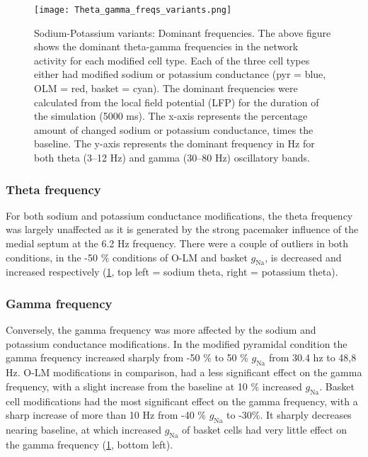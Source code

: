 \begin{figure}[htbp]
    \centering
    \texttt{[image: Theta\_gamma\_freqs\_variants.png]}
    \caption[Sodium-Potassium variants: Dominant frequencies]{Sodium-Potassium variants: Dominant frequencies.
        The above figure shows the dominant theta-gamma frequencies in the network activity for each modified cell type.
        Each of the three cell types either had modified sodium or potassium conductance (pyr = blue, OLM = red, basket = cyan).
        The dominant frequencies were calculated from the local field potential (LFP) for the duration of the simulation (5000 ms).
        The x-axis represents the percentage amount of changed sodium or potassium conductance, times the baseline.
        The y-axis represents the dominant frequency in Hz for both theta (3--12 Hz) and gamma (30--80 Hz) oscillatory bands.}\label{fig:sodium_potassium_frequencies}
\end{figure}

\subsubsection{Theta frequency}
For both sodium and potassium conductance modifications, the theta frequency was largely unaffected as it is generated by the strong pacemaker influence of the medial septum at the 6.2 Hz frequency.
There were a couple of outliers in both conditions, in the -50 \% conditions of O-LM and basket \(g_{\text{Na}}\), is decreased and increased respectively (\ref{fig:sodium_potassium_frequencies}, top left = sodium theta, right = potassium theta).

\subsubsection{Gamma frequency}
Conversely, the gamma frequency was more affected by the sodium and potassium conductance modifications.
In the modified pyramidal condition the gamma frequency increased sharply from -50 \% to 50 \% \(g_{\text{Na}}\) from 30.4 hz to 48,8 Hz.
O-LM modifications in comparison, had a less significant effect on the gamma frequency, with a slight increase from the baseline at 10 \% increased \(g_{\text{Na}}\).
Basket cell modifications had the most significant effect on the gamma frequency, with a sharp increase of more than 10 Hz from -40 \% \(g_{\text{Na}}\) to -30\%.
It sharply decreases nearing baseline, at which increased \(g_{\text{Na}}\) of basket cells had very little effect on the gamma frequency (\ref{fig:sodium_potassium_frequencies}, bottom left).

